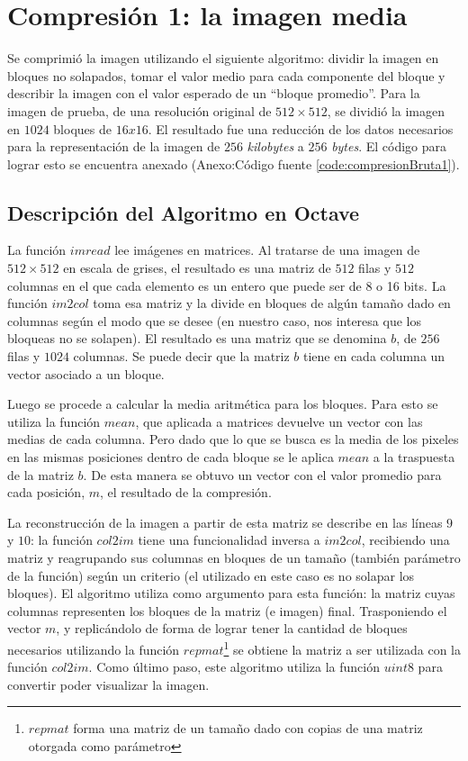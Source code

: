 \documentclass[twocolumn,a4paper,10pt]{article}
\begin{document}
\section{Compresi\'on 1: la imagen media}
\label{sec:compresion1}

Se comprimió la imagen utilizando el siguiente algoritmo: dividir la imagen en bloques no solapados, tomar el valor medio para cada componente del bloque y describir 
la imagen con el valor esperado de un ``bloque promedio''. Para la imagen de prueba, de una resolución original de $512 \times 512$, se dividió la imagen en $1024$ 
bloques de $16x16$. El resultado fue una reducción de los datos necesarios para la representación de la imagen de $256$ \textit{kilobytes} a $256$ 
\textit{bytes}. El código para lograr esto se encuentra anexado (Anexo:C\'odigo fuente \ref{code:compresionBruta1}).

\subsection{Descripción del Algoritmo en Octave}

La funci\'on $imread$ lee im\'agenes en matrices. Al tratarse de una imagen de $512 \times 512$ en escala de grises, el resultado es una matriz de $512$ filas y $512$
 columnas en el que cada elemento es un entero que puede ser de 8 o 16 bits. La funci\'on $im2col$ toma esa matriz y la divide en bloques de alg\'un tamaño dado en 
columnas seg\'un el modo que se desee (en nuestro caso, nos interesa que los bloqueas no se solapen). El resultado es una matriz que se denomina $b$, de $256$ filas y 
$1024$ columnas. Se puede decir que la matriz $b$ tiene en cada columna un vector asociado a un bloque. 

Luego se procede a calcular la media aritm\'etica para los bloques. Para esto se utiliza la funci\'on $mean$, que aplicada a matrices devuelve un vector con 
las medias de cada columna. Pero dado que lo que se busca es la media de los pixeles en las mismas posiciones dentro de cada bloque se le aplica $mean$ a la 
traspuesta de la matriz $b$. De esta manera se obtuvo un vector con el valor promedio para cada posición, $m$, el resultado de la compresión.

La reconstrucción de la imagen a partir de esta matriz se describe en las líneas $9$ y $10$: la función $col2im$ tiene una funcionalidad inversa a $im2col$, 
recibiendo una matriz y reagrupando sus columnas en bloques de un tamaño (también parámetro de la función) según un criterio (el utilizado en este caso es 
no solapar los bloques). El algoritmo utiliza como argumento para esta función: la matriz cuyas columnas representen los bloques de la matriz (e imagen) final. 
Trasponiendo el vector $m$, y replicándolo de forma de lograr tener la cantidad de bloques necesarios utilizando la funci\'on 
$repmat$\footnote{$repmat$ forma una matriz de un tamaño dado con copias de una matriz otorgada como parámetro} se obtiene la matriz a ser utilizada con la 
función $col2im$. Como último paso, este algoritmo utiliza la función $uint8$ para convertir poder visualizar la imagen.
\end{document}
